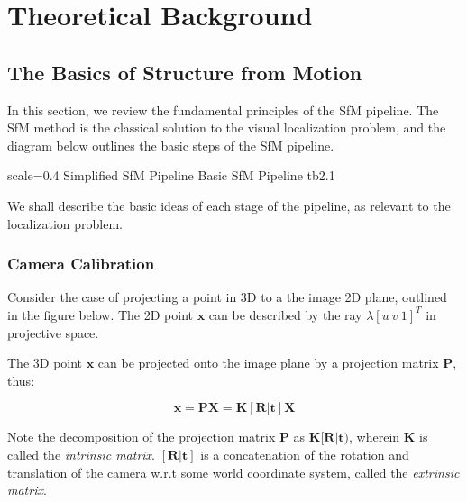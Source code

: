 

\chapter{Theoretical Background}

\section{The Basics of Structure from Motion}
In this section, we review the fundamental principles of the SfM pipeline. The SfM method is the classical solution to the visual localization problem, and the diagram below outlines the basic steps of the SfM pipeline.

       {scale=0.4}%
       {Simplified SfM Pipeline}%
       {Basic SfM Pipeline}%
       {tb2.1}

We shall describe the basic ideas of each stage of the pipeline, as relevant to the localization problem. 

\subsection{Camera Calibration}
Consider the case of projecting a point in 3D to a the image 2D plane, outlined in the figure below. The 2D point $\mathbf{x}$ can be described by the ray $\lambda[u\ v\ 1]^T$ in projective space.

The 3D point $\mathbf{x}$ can be projected onto the image plane by a projection matrix $\mathbf{P}$, thus:

\[\mathbf{x} = \mathbf{PX} = \mathbf{K[R|t]X}\]

Note the decomposition of the projection matrix $\mathbf{P}$ as $\mathbf{K[R|t})$, wherein \textbf{K} is called the \emph{ intrinsic matrix}. $\mathbf{[R|t]}$ is a concatenation of the rotation and translation of the camera w.r.t some world coordinate system, called the \emph{extrinsic matrix}.

